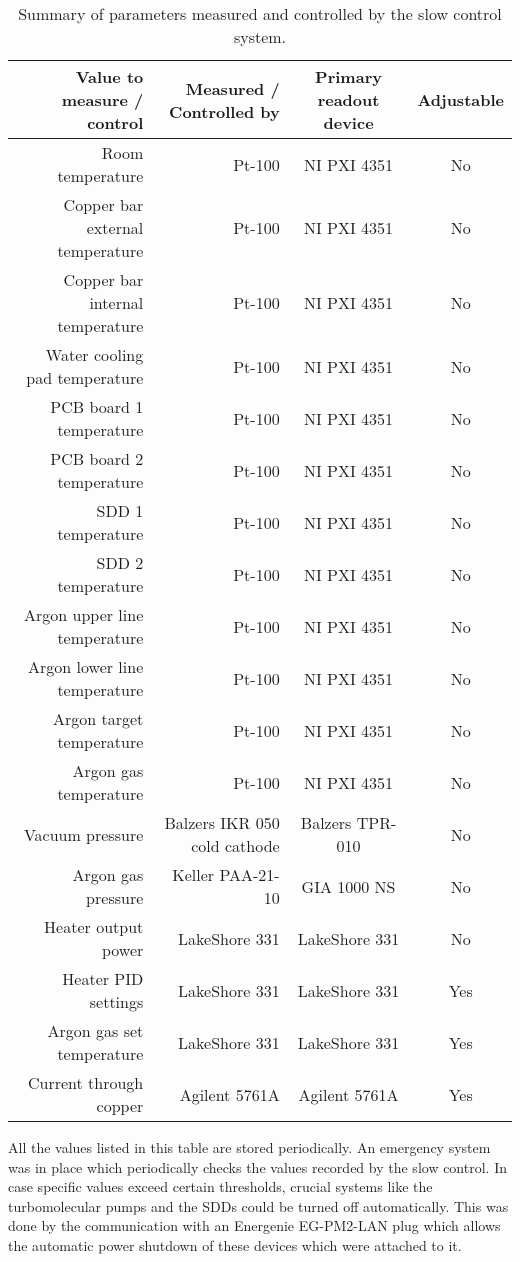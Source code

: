 \begin{table}[h]
 \centering
  \begin{tabular}{|D|D|c|c|}
  \hline
  Value to measure / control & Measured / Controlled by & Primary readout device & Adjustable  \\
  \hline  
  \hline
  Room temperature & Pt-100 & NI PXI 4351 & No \\
  \hline
  Copper bar external temperature & Pt-100 & NI PXI 4351 & No \\
  \hline
  Copper bar internal temperature & Pt-100 & NI PXI 4351 & No \\
  \hline
  Water cooling pad temperature & Pt-100 & NI PXI 4351 & No \\
  \hline
  PCB board 1 temperature & Pt-100 & NI PXI 4351 & No \\
  \hline
  PCB board 2 temperature & Pt-100 & NI PXI 4351 & No \\
  \hline
  SDD 1 temperature & Pt-100 & NI PXI 4351 & No \\
  \hline
  SDD 2 temperature & Pt-100 & NI PXI 4351 & No \\
  \hline
  Argon upper line temperature & Pt-100 & NI PXI 4351 & No \\
  \hline
  Argon lower line temperature & Pt-100 & NI PXI 4351 & No \\
  \hline
  Argon target temperature & Pt-100 & NI PXI 4351 & No \\
  \hline
  Argon gas temperature & Pt-100 & NI PXI 4351 & No \\
  \hline
  Vacuum pressure & Balzers IKR 050 cold cathode & Balzers TPR-010 & No \\
  \hline
  Argon gas pressure & Keller PAA-21-10 & GIA 1000 NS & No \\
  \hline
  Heater output power & LakeShore 331 & LakeShore 331 & No \\
  \hline
  Heater PID settings & LakeShore 331 & LakeShore 331 & Yes \\
  \hline
  Argon gas set temperature & LakeShore 331 & LakeShore 331 & Yes \\
  \hline
  Current through copper & Agilent 5761A & Agilent 5761A & Yes \\
  \hline
  \end{tabular}
    \caption{Summary of parameters measured and controlled by the slow control system.}
  \label{tab:slow_control}
\end{table}
All the values listed in this table are stored periodically. An emergency system was in place which periodically checks the values recorded by the slow control. In case specific values exceed certain thresholds, crucial systems like the turbomolecular pumps and the SDDs could be turned off automatically. This was done by the communication with an Energenie EG-PM2-LAN plug which allows the automatic power shutdown of these devices which were attached to it.
